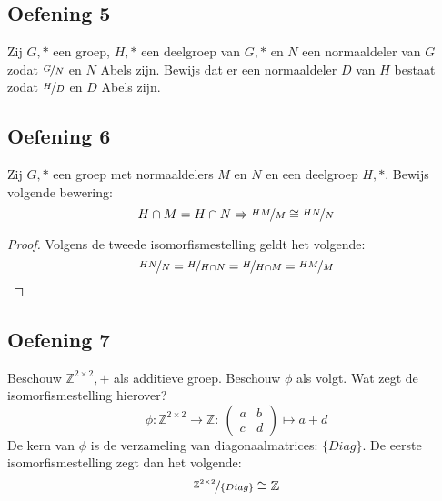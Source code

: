 \documentclass[main.tex]{subfiles}
\begin{document}
\subsection*{Oefening 5}
\label{sec:oz5-oef5} 
Zij $G,*$ een groep, $H,*$ een deelgroep van $G,*$ en $N$ een normaaldeler van $G$ zodat $\nicefrac{G}{N}$ en $N$ Abels zijn.
Bewijs dat er een normaaldeler $D$ van $H$ bestaat zodat $\nicefrac{H}{D}$ en $D$ Abels zijn.

\subsection*{Oefening 6}
\label{sec:oz5-oef6}
Zij $G,*$ een groep met normaaldelers $M$ en $N$ en een deelgroep $H,*$. 
Bewijs volgende bewering:
\[ H \cap M = H \cap N \Rightarrow \nicefrac{HM}{M} \cong \nicefrac{HN}{N} \]
\begin{proof}
  Volgens de tweede isomorfismestelling geldt het volgende:
  \[ \nicefrac{HN}{N} = \nicefrac{H}{H\cap N} = \nicefrac{H}{H\cap M} = \nicefrac{HM}{M} \]
\end{proof}

\subsection*{Oefening 7}
\label{sec:oz5-oef7}
Beschouw $\mathbb{Z}^{2\times 2},+$ als additieve groep.
Beschouw $\phi$ als volgt. Wat zegt de isomorfismestelling hierover?
\[
\phi: \mathbb{Z}^{2\times 2} \rightarrow \mathbb{Z}:\
\begin{pmatrix}
  a & b\\
  c & d
\end{pmatrix}
\mapsto a + d
\]
De kern van $\phi$ is de verzameling van diagonaalmatrices: $\{Diag\}$.
De eerste isomorfismestelling zegt dan het volgende:
\[ \nicefrac{\mathbb{Z}^{2\times 2}}{\{Diag\}} \cong \mathbb{Z} \]
\begin{figure}[H]
  \centering
\end{figure}
\end{document}

